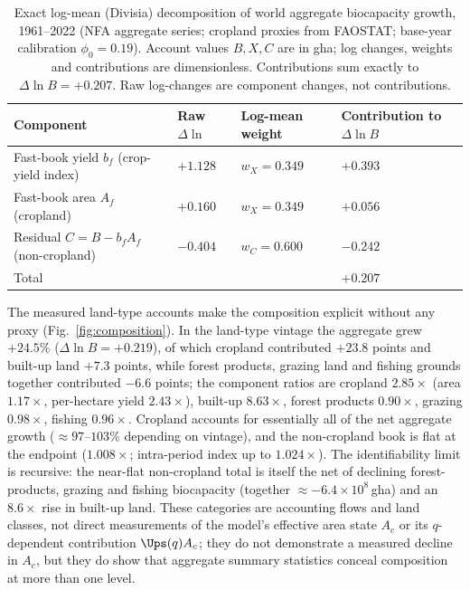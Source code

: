 \begin{table}[!htbp]
\centering\small
\caption{Exact log-mean (Divisia) decomposition of world aggregate biocapacity growth, 1961--2022 (NFA aggregate series; cropland proxies from FAOSTAT; base-year calibration $\phi_0=0.19$). Account values $B,X,C$ are in gha; log changes, weights and contributions are dimensionless. Contributions sum exactly to $\Delta\ln B=+0.207$. Raw log-changes are component changes, not contributions.}
\label{tab:divisia}
\begin{tabularx}{\textwidth}{X l l l}
\toprule
Component & Raw $\Delta\ln$ & Log-mean weight & Contribution to $\Delta\ln B$ \\
\midrule
Fast-book yield $b_f$ (crop-yield index) & $+1.128$ & $w_X=0.349$ & $+0.393$ \\
Fast-book area $A_f$ (cropland) & $+0.160$ & $w_X=0.349$ & $+0.056$ \\
Residual $C=B-b_fA_f$ (non-cropland) & $-0.404$ & $w_C=0.600$ & $-0.242$ \\
\midrule
Total & & & $+0.207$ \\
\bottomrule
\end{tabularx}
\end{table}

The measured land-type accounts make the composition explicit without any proxy (Fig.~\ref{fig:composition}). In the land-type vintage the aggregate grew $+24.5\%$ ($\Delta\ln B=+0.219$), of which cropland contributed $+23.8$ points and built-up land $+7.3$ points, while forest products, grazing land and fishing grounds together contributed $-6.6$ points; the component ratios are cropland $2.85\times$ (area $1.17\times$, per-hectare yield $2.43\times$), built-up $8.63\times$, forest products $0.90\times$, grazing $0.98\times$, fishing $0.96\times$. Cropland accounts for essentially all of the net aggregate growth ($\approx97$--$103\%$ depending on vintage), and the non-cropland book is flat at the endpoint ($1.008\times$; intra-period index up to $1.024\times$). The identifiability limit is recursive: the near-flat non-cropland total is itself the net of declining forest-products, grazing and fishing biocapacity (together $\approx-6.4\times10^{8}$\,gha) and an $8.6\times$ rise in built-up land. These categories are accounting flows and land classes, not direct measurements of the model's effective area state $A_c$ or its $q$-dependent contribution $\Ups(q)A_c$; they do not demonstrate a measured decline in $A_c$, but they do show that aggregate summary statistics conceal composition at more than one level.

